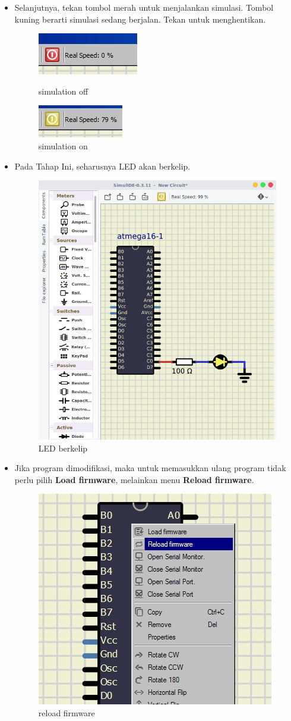 \documentclass[12pt,]{article}
\begin{document}
\begin{itemize}
		\item Selanjutnya, tekan tombol merah untuk menjalankan simulasi.
		Tombol kuning berarti simulasi sedang berjalan. Tekan untuk menghentikan.
		
		\begin{figure}[H]
			\centering
			\includegraphics[width=0.25\linewidth]{images/tessim_off}
			\caption{simulation off}
			\includegraphics[width=0.25\linewidth]{images/tessim_on}
			\caption{simulation on}
		\end{figure}
	
		\item Pada Tahap Ini, seharusnya LED akan berkelip.
		
		\begin{figure}[H]
			\centering
			\includegraphics[width=0.5\linewidth]{images/tessim_4}
			\caption{LED berkelip}
		\end{figure}
		
		\item Jika program dimodifikasi, maka untuk memasukkan ulang program tidak perlu pilih \textbf{Load firmware},
		melainkan menu \textbf{Reload firmware}.
		
		\begin{figure}[H]
			\centering
			\includegraphics[width=0.5\linewidth]{images/tessim_5}
			\caption{reload firmware}
		\end{figure}
	\end{itemize}
\end{document}
